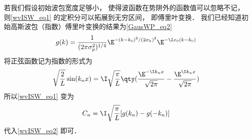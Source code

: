 若我们假设初始波包宽度足够小， 使得波函数在势阱外的函数值可以忽略不记， 则\autoref{wvISW_eq1} 的定积分可以拓展到无穷区间， 即傅里叶变换． 我们已经知道初始高斯波包（指数）傅里叶变换的结果为\autoref{GausWP_eq2}~
\begin{equation}
g(k) = \frac{1}{(2\pi \sigma _p^2)^{1/4}} \E^{-(k - k_0)^2/(2\sigma _k)^2} \E^{-\I x_0(k - k_0)}
\end{equation}
将正弦函数记为指数的形式为
\begin{equation}
\sqrt{\frac{2}{L}} \sin(k_n x) = \I \sqrt{\frac{\pi }{L}} \qty(\frac{\E^{-\I k_n x}}{\sqrt{2\pi }} - \frac{\E^{\I k_n x}}{\sqrt{2\pi }})
\end{equation}
所以\autoref{wvISW_eq1} 变为
\begin{equation}
C_n = \I \sqrt{\frac{\pi }{L}} [g(k_n) - g(-k_n)]
\end{equation}
代入\autoref{wvISW_eq2} 即可．
